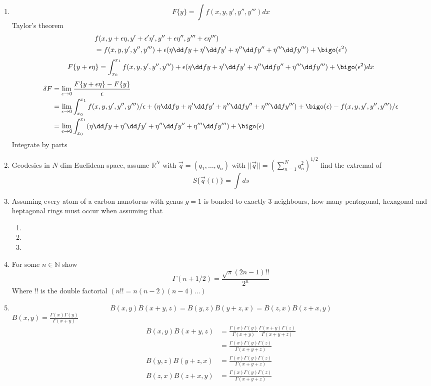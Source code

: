 \documentclass{X:/Documents/Coding/Latex/myassignment}
\begin{document}
\begin{enumerate}
	\item 
	\[F\{y\} = \int f(x,y,y',y'',y''') dx\]
	Taylor's theorem
	\begin{align*}
		&f(x,y+\epsilon \eta, y' + \epsilon'\eta', y'' + \epsilon\eta '', y'''+ \epsilon\eta''')\\
		&= f(x,y,y',y'',y''') + \epsilon(\eta \dd fy + \eta' \dd f{y'} + \eta'' \dd f{y''} + \eta''' \dd f{y'''}) + \bigo(\epsilon^2)
	\end{align*}
	\[F\{y+\epsilon\eta\} = \int_{x_0}^{x_1} f(x,y,y',y'',y''') + \epsilon(\eta \dd fy + \eta' \dd f{y'} + \eta'' \dd f{y''} + \eta''' \dd f{y'''}) + \bigo(\epsilon^2) dx\]
	\begin{align*}
		\delta F &= \lim_{\epsilon \to 0} \frac{F\{y + \epsilon \eta\} - F\{y\}}{\epsilon}\\
		&=\lim_{\epsilon \to 0} \int_{x_0}^{x_1} f(x,y,y',y'',y''')/\epsilon + (\eta \dd fy + \eta' \dd f{y'} + \eta'' \dd f{y''} + \eta''' \dd f{y'''}) + \bigo(\epsilon) - f(x,y,y',y'',y''')/\epsilon\\
		&=\lim_{\epsilon \to 0} \int_{x_0}^{x_1}  (\eta \dd fy + \eta' \dd f{y'} + \eta'' \dd f{y''} + \eta''' \dd f{y'''}) + \bigo(\epsilon)\\
	\end{align*}
	Integrate by parts
	\item Geodesics in $N$ dim Euclidean space, assume $\mathbb{R}^N$ with $\vec q= (q_1,\ldots,q_n)$ with $||\vec q|| = \left(\sum_{n=1}^N q_n^2\right)^{1/2}$ find the extremal of
	\[S\{\vec q(t)\} = \int ds\]
	\item Assuming every atom of a carbon nanotorus with genus $g=1$ is bonded to exactly 3 neighbours, how many pentagonal, hexagonal and heptagonal rings must occur when assuming that
	\begin{enumerate}
		\item 
		\item 
		\item 
	\end{enumerate}
	\item For some $n\in \mathbb{N}$ show
	\[\Gamma(n+1/2) = \frac{\sqrt{\pi} (2n-1)!!}{2^n}\]
	Where $!!$ is the double factorial $(n!! = n(n-2)(n-4)\ldots)$
	\item 
	\[B(x,y)B(x+y,z) = B(y,z) B(y+z,x) = B(z,x) B(z+x,y)\]
	$B(x,y) = \frac{\Gamma(x) \Gamma(y)}{\Gamma(x+y)}$
	\begin{align*}
		B(x,y)B(x+y,z) &= \frac{\Gamma(x) \Gamma(y)}{\Gamma(x+y)} \frac{\Gamma(x+y) \Gamma(z)}{\Gamma(x+y+z)}\\
		&= \frac{\Gamma(x) \Gamma(y)\Gamma(z)}{\Gamma(x+y+z)}\\
		B(y,z) B(y+z,x) &= \frac{\Gamma(x) \Gamma(y)\Gamma(z)}{\Gamma(x+y+z)}\\
		B(z,x) B(z+x,y) &= \frac{\Gamma(x) \Gamma(y)\Gamma(z)}{\Gamma(x+y+z)}\\
	\end{align*}


\end{enumerate}
\end{document}
